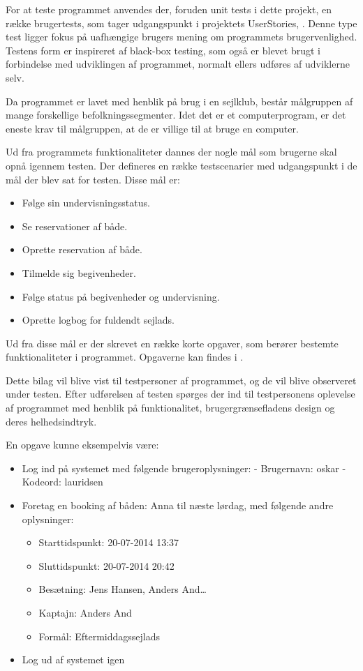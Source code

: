 For at teste programmet anvendes der, foruden unit tests i dette projekt, en række brugertests, som tager udgangspunkt i projektets UserStories, .
Denne type test ligger fokus på uafhængige brugers mening om programmets brugervenlighed.
Testens form er inspireret af black-box testing, som også er blevet brugt i forbindelse med udviklingen af programmet, normalt ellers udføres af udviklerne selv.

Da programmet er lavet med henblik på brug i en sejlklub, består målgruppen af mange forskellige befolkningssegmenter. 
Idet det er et computerprogram, er det eneste krav til målgruppen, at de er villige til at bruge en computer.

Ud fra programmets funktionaliteter dannes der nogle mål som brugerne skal opnå igennem testen. 
Der defineres en række testscenarier med udgangspunkt i de mål der blev sat for testen.
Disse mål er:
\begin{itemize}
  \item Følge sin undervisningsstatus.
  \item Se reservationer af både.
  \item Oprette reservation af både.
  \item Tilmelde sig begivenheder.
  \item Følge status på begivenheder og undervisning.
  \item Oprette logbog for fuldendt sejlads.
\end{itemize}

Ud fra disse mål er der skrevet en række korte opgaver, som berører bestemte funktionaliteter i programmet. 
Opgaverne kan findes i .

Dette bilag vil blive vist til testpersoner af programmet, og de vil blive observeret under testen. 
Efter udførelsen af testen spørges der ind til testpersonens oplevelse af programmet med henblik på funktionalitet, brugergrænsefladens design og deres helhedsindtryk.

En opgave kunne eksempelvis være:
\begin{itemize}
	\item Log ind på systemet med følgende brugeroplysninger:
	\newline - Brugernavn: oskar
	\newline - Kodeord: lauridsen
	\item Foretag en booking af båden: Anna til næste lørdag, med følgende andre oplysninger: 
	\begin{itemize}
		\item Starttidspunkt: 20-07-2014 13:37
		\item Sluttidspunkt: 20-07-2014 20:42
		\item Besætning: Jens Hansen, Anders And\ldots
		\item Kaptajn: Anders And
		\item Formål: Eftermiddagssejlads
	\end{itemize}
	\item Log ud af systemet igen
\end{itemize}

